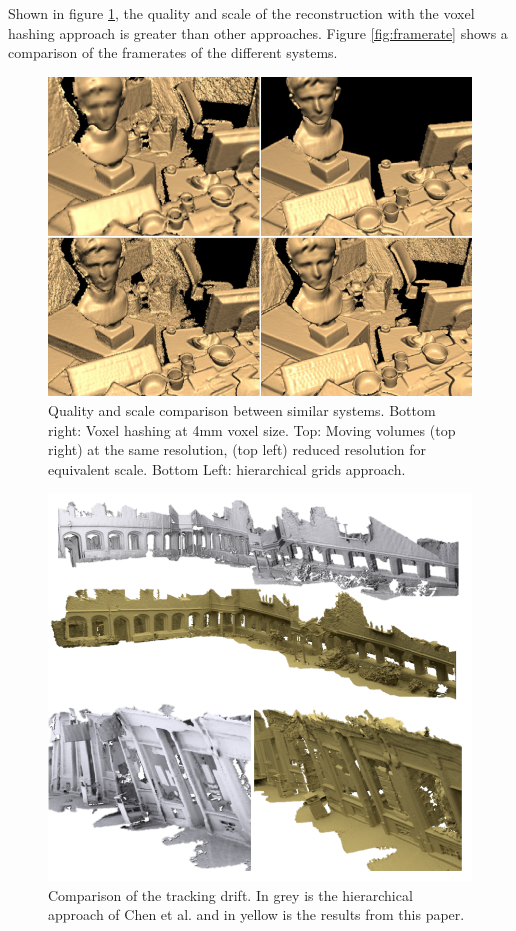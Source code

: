 \documentclass[10pt, twocolumn]{article}
\begin{document}
Shown in figure \ref{fig:compare}, the quality and scale of the reconstruction
with the voxel hashing approach is greater than other approaches. Figure
\ref{fig:framerate} shows a comparison of the framerates of the different systems.


\begin{figure}
  \centering
  \includegraphics[width=1.0\linewidth]{comparison}
  \caption{Quality and scale comparison between similar systems. Bottom right:
    Voxel hashing at 4mm voxel size. Top: Moving volumes (top right) at the same
    resolution, (top left) reduced resolution for equivalent scale. Bottom Left:
    hierarchical grids approach.}
  \label{fig:compare}
\end{figure}

\begin{figure}
  \centering
  \includegraphics[width=1.0\linewidth]{compare}
  \caption{Comparison of the tracking drift. In grey is the hierarchical
    approach of Chen et al. \cite{chen2013scalable} and in yellow is the results
  from this paper.}
  \label{fig:comparetracking}
\end{figure}
\end{document}
